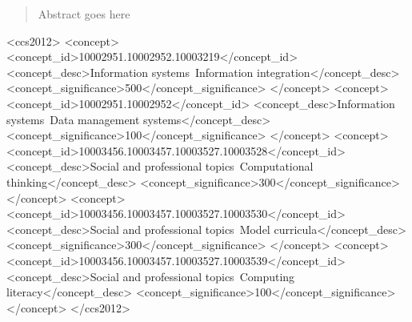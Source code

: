 \documentclass{sig-alternate}
\begin{document}
\date{1 September 2016}

\maketitle
\begin{abstract}
Abstract goes here
\end{abstract}


%
%
\begin{CCSXML}
<ccs2012>
<concept>
<concept_id>10002951.10002952.10003219</concept_id>
<concept_desc>Information systems~Information integration</concept_desc>
<concept_significance>500</concept_significance>
</concept>
<concept>
<concept_id>10002951.10002952</concept_id>
<concept_desc>Information systems~Data management systems</concept_desc>
<concept_significance>100</concept_significance>
</concept>
<concept>
<concept_id>10003456.10003457.10003527.10003528</concept_id>
<concept_desc>Social and professional topics~Computational thinking</concept_desc>
<concept_significance>300</concept_significance>
</concept>
<concept>
<concept_id>10003456.10003457.10003527.10003530</concept_id>
<concept_desc>Social and professional topics~Model curricula</concept_desc>
<concept_significance>300</concept_significance>
</concept>
<concept>
<concept_id>10003456.10003457.10003527.10003539</concept_id>
<concept_desc>Social and professional topics~Computing literacy</concept_desc>
<concept_significance>100</concept_significance>
</concept>
</ccs2012>
\end{CCSXML}




%
%

%
%
\printccsdesc

\end{document}
